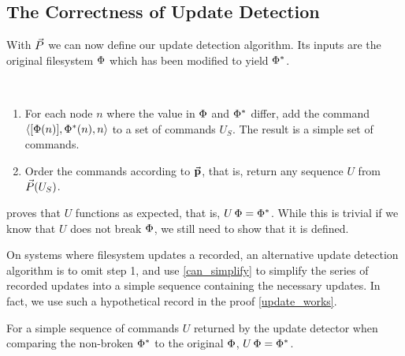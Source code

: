 
\subsection{The Correctness of Update Detection}

With $\vec{P}$ we can now define our update detection algorithm.
Its inputs are the original filesystem $\Phi$ which has been modified to yield $\Phi^*$.
\begin{mydef}~
\begin{enumerate}
    \item For each node $n$ where the value in $\Phi$ and $\Phi^*$ differ, add the command $\langle{[\Phi(n)],\Phi^*(n),n}\rangle$ to
        a set of commands $U_S$. The result is a simple set of commands.
    \item Order the commands according to $\mathrel{\vec{\mathbf{p}}}$, that is, 
        return any sequence $U$ from $\vec{P}({U_S})$.
\end{enumerate}
\end{mydef}

 proves that $U$ functions as expected, that is, $U\,\Phi=\Phi^*$.
While this is trivial if we know that $U$ does not break $\Phi$, we
still need to show that it is defined.

On systems where filesystem updates a recorded,
an alternative update detection algorithm is to
omit step 1, and use \cref{can_simplify} to simplify the series of recorded updates into a simple sequence containing the necessary
updates.
In fact, we use such a hypothetical record in the proof \cref{update_works}.


\begin{myth}
For a simple sequence of commands $U$ returned by the update detector
when comparing the non-broken $\Phi^*$ to the original $\Phi$,
$U\,\Phi = \Phi^*$.
\end{myth}

